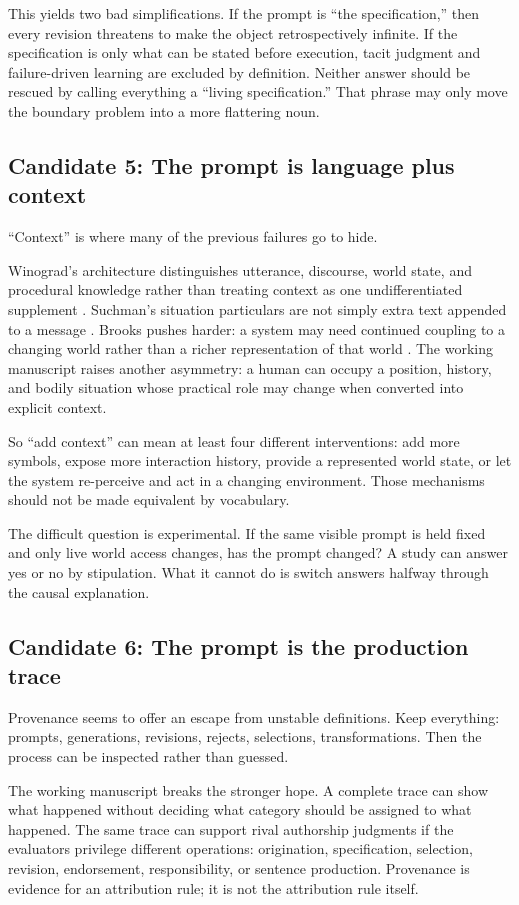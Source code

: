 \documentclass[11pt]{article}
\newcommand{\candidate}[1]{\subsection*{Candidate #1}}
\begin{document}
This yields two bad simplifications. If the prompt is “the specification,” then every revision threatens to make the object retrospectively infinite. If the specification is only what can be stated before execution, tacit judgment and failure-driven learning are excluded by definition. Neither answer should be rescued by calling everything a “living specification.” That phrase may only move the boundary problem into a more flattering noun.

\candidate{5: The prompt is language plus context}
“Context” is where many of the previous failures go to hide.

Winograd’s architecture distinguishes utterance, discourse, world state, and procedural knowledge rather than treating context as one undifferentiated supplement \parencite{winograd1973procedural}. Suchman’s situation particulars are not simply extra text appended to a message \parencite{suchman1985plans}. Brooks pushes harder: a system may need continued coupling to a changing world rather than a richer representation of that world \parencite{brooks1991intelligence}. The working manuscript raises another asymmetry: a human can occupy a position, history, and bodily situation whose practical role may change when converted into explicit context.

So “add context” can mean at least four different interventions: add more symbols, expose more interaction history, provide a represented world state, or let the system re-perceive and act in a changing environment. Those mechanisms should not be made equivalent by vocabulary.

The difficult question is experimental. If the same visible prompt is held fixed and only live world access changes, has the prompt changed? A study can answer yes or no by stipulation. What it cannot do is switch answers halfway through the causal explanation.

\candidate{6: The prompt is the production trace}
Provenance seems to offer an escape from unstable definitions. Keep everything: prompts, generations, revisions, rejects, selections, transformations. Then the process can be inspected rather than guessed.

The working manuscript breaks the stronger hope. A complete trace can show what happened without deciding what category should be assigned to what happened. The same trace can support rival authorship judgments if the evaluators privilege different operations: origination, specification, selection, revision, endorsement, responsibility, or sentence production. Provenance is evidence for an attribution rule; it is not the attribution rule itself.
\end{document}
